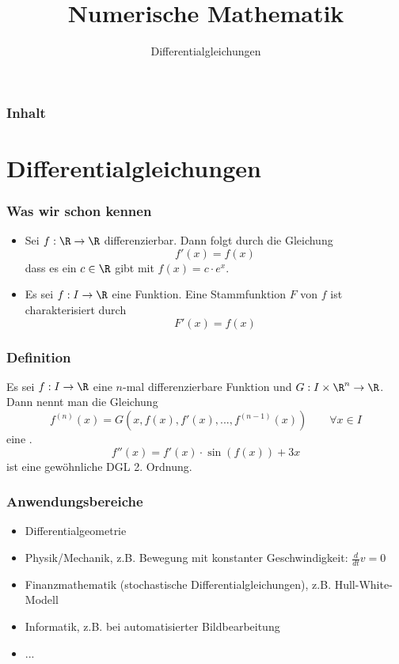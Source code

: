 

\title{Numerische Mathematik}
\subtitle{Differentialgleichungen}



\makeTitlePage

\begin{frame}\frametitle{Inhalt}
   \tableofcontents
\end{frame}
%

%

\section{Differentialgleichungen}
\makeSectionDividerPage
%
%
\begin{frame}\frametitle{Was wir schon kennen}
\begin{itemize}
\item Sei $f:\R \to \R$ differenzierbar. Dann folgt durch die Gleichung
$$
f'(x)=f(x)
$$
dass es ein $c\in \R$ gibt mit $f(x)=c\cdot e^x$.\vfill
\item Es sei $f: I \to \R$ eine Funktion. Eine Stammfunktion $F$ von $f$ ist charakterisiert durch
$$
F'(x)=f(x)
$$
\end{itemize}
\end{frame}
%
%
\begin{frame}\frametitle{Definition}
Es sei $f: I \to \R$ eine $n$-mal differenzierbare Funktion und $G: I\times\R^{n} \to \R$. Dann nennt man die Gleichung
$$
f^{(n)}(x)=G(x,f(x),f'(x),...,f^{(n-1)}(x)) \qquad \forall x \in I
$$
eine .
\pause\vfill
{}\\
$$
f''(x)=f'(x)\cdot \sin(f(x))+3x
$$
 ist eine gewöhnliche DGL 2. Ordnung.
\end{frame}
%
%
\begin{frame}\frametitle{Anwendungsbereiche}
\begin{itemize}
\item Differentialgeometrie
\item Physik/Mechanik, z.B. Bewegung mit konstanter Geschwindigkeit: $\frac{d}{dt}v=0$
\item Finanzmathematik (stochastische Differentialgleichungen), z.B. Hull-White-Modell
\item Informatik, z.B. bei automatisierter Bildbearbeitung
\item ...
\end{itemize}
\end{frame}
%
%
